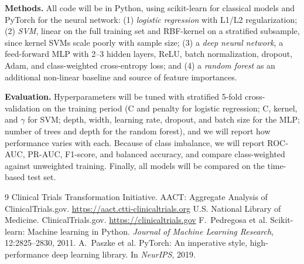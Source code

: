 \documentclass[12pt]{article}
\begin{document}
\textbf{Methods.} All code will be in Python, using scikit-learn \cite{sklearn} for classical models and PyTorch \cite{pytorch} for the neural network: (1) \emph{logistic regression} with L1/L2 regularization; (2) \emph{SVM}, linear on the full training set and RBF-kernel on a stratified subsample, since kernel SVMs scale poorly with sample size; (3) a \emph{deep neural network}, a feed-forward MLP with 2--3 hidden layers, ReLU, batch normalization, dropout, Adam, and class-weighted cross-entropy loss; and (4) a \emph{random forest} as an additional non-linear baseline and source of feature importances.

\textbf{Evaluation.} Hyperparameters will be tuned with stratified 5-fold cross-validation on the training period (C and penalty for logistic regression; C, kernel, and $\gamma$ for SVM; depth, width, learning rate, dropout, and batch size for the MLP; number of trees and depth for the random forest), and we will report how performance varies with each. Because of class imbalance, we will report ROC-AUC, PR-AUC, F1-score, and balanced accuracy, and compare class-weighted against unweighted training. Finally, all models will be compared on the time-based test set.

\begin{thebibliography}{9}
 Clinical Trials Transformation Initiative. AACT: Aggregate Analysis of ClinicalTrials.gov. \url{https://aact.ctti-clinicaltrials.org}
 U.S. National Library of Medicine. ClinicalTrials.gov. \url{https://clinicaltrials.gov}
 F.~Pedregosa et al. Scikit-learn: Machine learning in Python. \emph{Journal of Machine Learning Research}, 12:2825--2830, 2011.
 A.~Paszke et al. PyTorch: An imperative style, high-performance deep learning library. In \emph{NeurIPS}, 2019.
\end{thebibliography}
\end{document}
